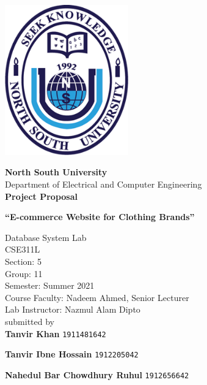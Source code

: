 \documentclass{article}
\begin{document}
\begin{titlepage}
\begin{center}

        \includegraphics[width=0.4\textwidth]{NSU_logo}
        
        \LARGE
      	  \textbf{North South University} \\
        Department of Electrical and Computer Engineering\\		
                \vspace*{0.2cm}
	 \textbf{Project Proposal}\\
        
        \vspace*{0.5 cm}
        
        \Huge
        \textbf{``E-commerce Website for Clothing Brands'' }
      
      \vspace{0.5cm}
        \Large
        \textrm{Database System Lab}\\
        \textrm{CSE311L}\\
        \textrm{Section: 5}\\
        \textrm{Group: 11}\\
        \textrm{Semester: Summer 2021}\\
        \textrm{Course Faculty: Nadeem Ahmed, Senior Lecturer}\\
        \textrm{Lab Instructor: Nazmul Alam Dipto}\\



        
        \vspace{1cm}
        \Large
       submitted by\\
        \textbf{Tanvir Khan}
       \texttt{1911481642}  
        
        \textbf{Tanvir Ibne Hossain}
        \texttt{1912205042}     
        
        \textbf{Nahedul Bar Chowdhury Ruhul}
        \texttt{1912656642}  
        

    \end{center}

\end{titlepage}
\end{document}
